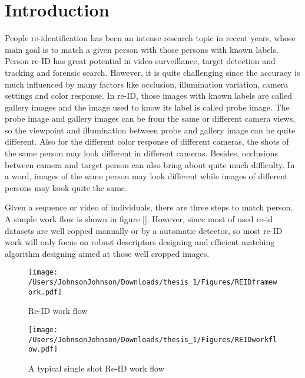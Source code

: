 \chapter{Introduction}

People re-identification has been an intense research topic in recent years, whose main goal is to match a given person with those persons with known labels. Person re-ID has great potential in video surveillance, target detection and tracking and forensic search. However, it is quite challenging since the accuracy is much influenced by many factors like occlusion, illumination variation, camera settings and color response. In re-ID, those images with known labels are called gallery images and the image used to know its label is called probe image. The probe image and gallery images can be from the same or different camera views, so the viewpoint and illumination between probe and gallery image can be quite different. Also for the different color response of different cameras, the shots of the same person may look different in different cameras. Besides, occlusions between camera and target person can also bring about quite much difficulty.  In a word, images of the same person may look different while images of different persons may kook quite the same. 

Given a sequence or video of individuals, there are three steps to match person. A simple work flow is shown in figure []. However, since most of used re-id datasets are well copped manually or by a automatic detector, so most re-ID work will only focus on robust descriptors designing and efficient matching algorithm designing aimed at those well cropped images. 


\begin{figure}
\centering
\begin{raggedleft}
\texttt{[image: /Users/JohnsonJohnson/Downloads/thesis\_1/Figures/REIDframework.pdf]}
\vspace{1em}
\caption{Re-ID work flow}
\end{raggedleft}
\end{figure}

\begin{figure}
\centering
\texttt{[image: /Users/JohnsonJohnson/Downloads/thesis\_1/Figures/REIDworkflow.pdf]}
\vspace{1em}
\caption{A typical single shot Re-ID work flow}
\end{figure}




